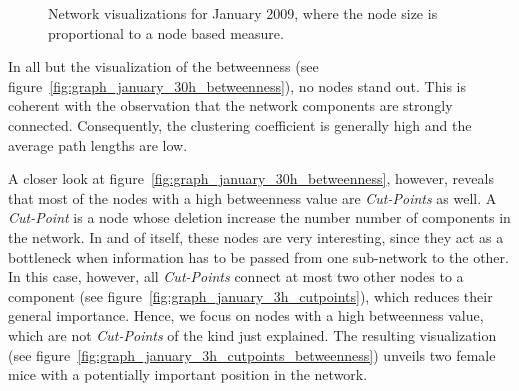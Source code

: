 \begin{figure}[htpb]
	\qquad 
		
	\caption[Network visualizations where the node size is proportional to node based measures]{Network visualizations for January 2009, where the node size is proportional to a node based measure.}
	\label{fig:graph_january_30h_node_based_measures} 
	 
\end{figure}

In all but the visualization of the betweenness (see figure~\ref{fig:graph_january_30h_betweenness}), no nodes stand out. This is coherent with the observation that the network components are strongly connected. Consequently, the clustering coefficient is generally high and the average path lengths are low.  


A closer look at figure~\ref{fig:graph_january_30h_betweenness}, however, reveals that most of the nodes with a high betweenness value are \textit{Cut-Points} as well. A \textit{Cut-Point} is a node whose deletion increase the number number of components in the network\citep{pajek:03}. In and of itself, these nodes are very interesting, since they act as a bottleneck when information has to be passed from one sub-network to the other. In this case, however, all \textit{Cut-Points} connect at most two other nodes to a component (see figure~\ref{fig:graph_january_3h_cutpoints}), which reduces their general importance. Hence, we focus on nodes with a high betweenness value, which are not \textit{Cut-Points} of the kind just explained. The resulting visualization (see figure~\ref{fig:graph_january_3h_cutpoints_betweenness}) unveils two female mice with a potentially important position in the network. 

